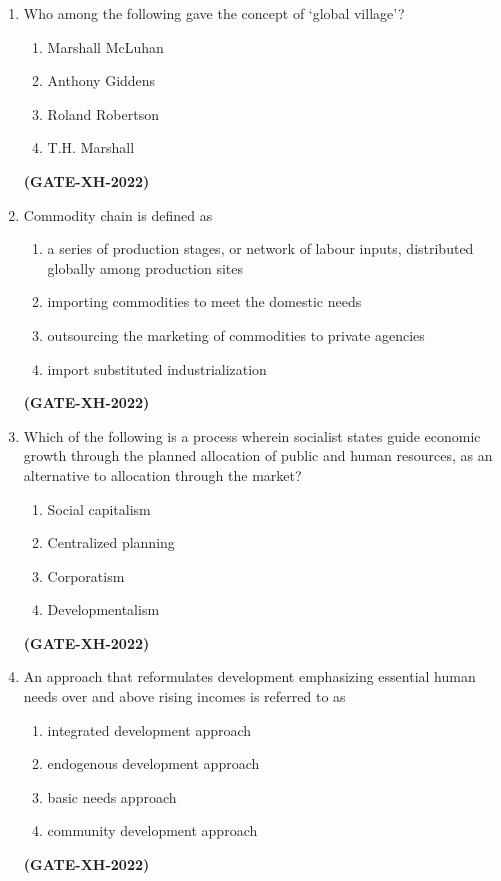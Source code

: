 \documentclass[journal]{IEEEtran}
\begin{document}
\begin{enumerate}
\item
Who among the following gave the concept of ‘global village’?
\begin{multicols}{2}
\begin{enumerate}
\item Marshall McLuhan
\item Anthony Giddens
\item Roland Robertson
\item T.H. Marshall
\end{enumerate}
\end{multicols}
\hfill\textbf{(GATE-XH-2022)}

\item
Commodity chain is defined as
\begin{enumerate}
\item a series of production stages, or network of labour inputs, distributed globally among production sites
\item importing commodities to meet the domestic needs
\item outsourcing the marketing of commodities to private agencies
\item import substituted industrialization
\end{enumerate}
\hfill\textbf{(GATE-XH-2022)}

\item
Which of the following is a process wherein socialist states guide economic growth through the planned allocation of public and human resources, as an alternative to allocation through the market?
\begin{multicols}{2}
\begin{enumerate}
\item Social capitalism
\item Centralized planning
\item Corporatism
\item Developmentalism
\end{enumerate}
\end{multicols}
\hfill\textbf{(GATE-XH-2022)}

\item
An approach that reformulates development emphasizing essential human needs over and above rising incomes is referred to as
\begin{multicols}{2}
\begin{enumerate}
\item integrated development approach
\item endogenous development approach
\item basic needs approach
\item community development approach
\end{enumerate}
\end{multicols}
\hfill\textbf{(GATE-XH-2022)}


\end{enumerate}
\end{document}
